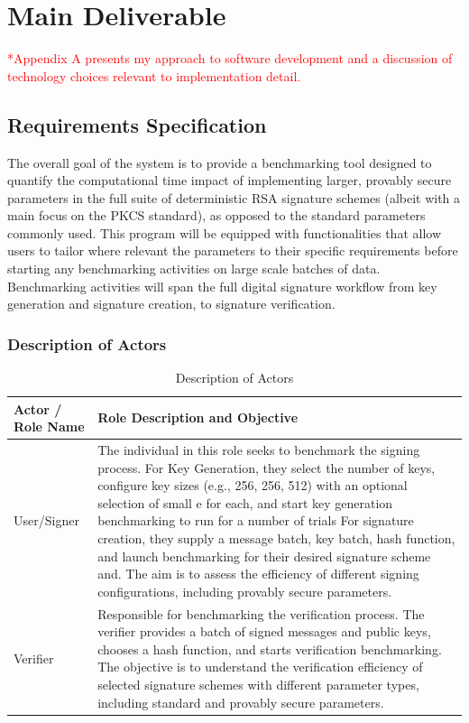 \documentclass[]{final_report}
\theoremstyle{definition}
\begin{document}
\chapter{Main Deliverable}



\textcolor{red}{*Appendix A presents my approach to software development and a discussion of technology choices relevant to implementation detail.}



\section{Requirements Specification}
The overall goal of the system is to provide a benchmarking tool designed to quantify the computational time impact of implementing larger, provably secure parameters in the full suite of deterministic RSA signature schemes (albeit with a main focus on the PKCS standard), as opposed to the standard parameters commonly used. This program will be equipped with functionalities that allow users to tailor where relevant the parameters to their specific requirements before starting any benchmarking activities on large scale batches of data. Benchmarking activities will span the full digital signature workflow from key generation and signature creation, to signature verification.
\subsection{Description of Actors}

\begin{table}[H]
    \centering
    \caption{Description of Actors}
    \label{tab:actors_description}
    \begin{tabular}{|l|p{10cm}|}
    \hline
    \textbf{Actor / Role Name} & \textbf{Role Description and Objective} \\
    \hline
        User/Signer & The individual in this role seeks to benchmark the signing process. For Key Generation, they select the number of keys,  configure key sizes (e.g., 256, 256, 512) with an optional selection of small e for each, and start key generation benchmarking to run for a number of trials  For signature creation, they supply a message batch, key batch, hash function, and launch benchmarking for their desired signature scheme and. The aim is to assess the efficiency of different signing configurations, including provably secure parameters. \\
    \hline
       Verifier & Responsible for benchmarking the verification process. The verifier provides a batch of signed messages and public keys, chooses a hash function, and starts verification benchmarking. The objective is to understand the verification efficiency of selected signature schemes with different parameter types, including standard and provably secure parameters.  \\
    \hline
    \end{tabular}
\end{table}
\end{document}
